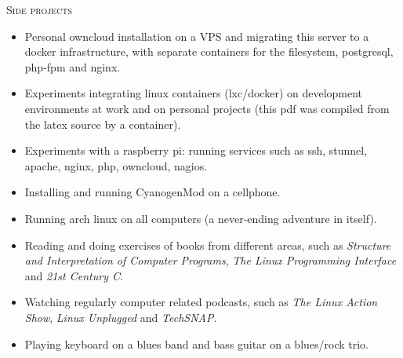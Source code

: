 \noindent
\textsc{\Large Side projects} \\
\begin{itemize}
    \vspace{-2.5mm}
    \itemsep-1mm
    \item Personal owncloud installation on a VPS and migrating this server to
        a docker infrastructure, with separate containers for the filesystem,
        postgresql, php-fpm and nginx.
    \item Experiments integrating linux containers (lxc/docker) on development
        environments at work and on personal projects (this pdf was compiled
        from the latex source by a container).
    \item Experiments with a raspberry pi: running services such as ssh,
        stunnel, apache, nginx, php, owncloud, nagios.
    \item Installing and running CyanogenMod on a cellphone.
    \item Running arch linux on all computers (a never-ending adventure in
        itself).
    \item Reading and doing exercises of books from different areas, such as
        \textit{Structure and Interpretation of Computer Programs}, \textit{The
        Linux Programming Interface} and \textit{21st Century C}.
    \item Watching regularly computer related podcasts, such as \textit{The
        Linux Action Show}, \textit{Linux Unplugged} and \textit{TechSNAP}.
    \item Playing keyboard on a blues band and bass guitar on a blues/rock
        trio.
\end{itemize}
